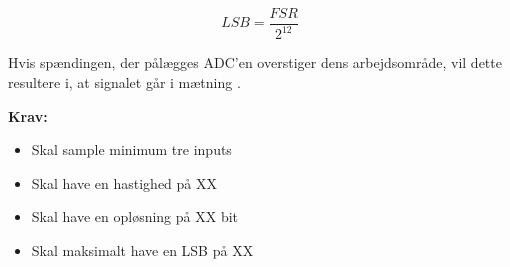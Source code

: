 \begin{equation} \label{equ:LSB}
LSB=\dfrac{FSR}{2^{12}}
\end{equation}

\noindent
Hvis spændingen, der pålægges ADC'en overstiger dens arbejdsområde, vil dette resultere i, at signalet går i mætning \citep{webster1998, wolf2004}. 

\vspace{3mm}
\textbf{Krav:}
\begin{itemize}
\item Skal sample minimum tre inputs 
\item Skal have en hastighed på XX
\item Skal have en opløsning på XX bit
\item Skal maksimalt have en LSB på XX
\end{itemize}

